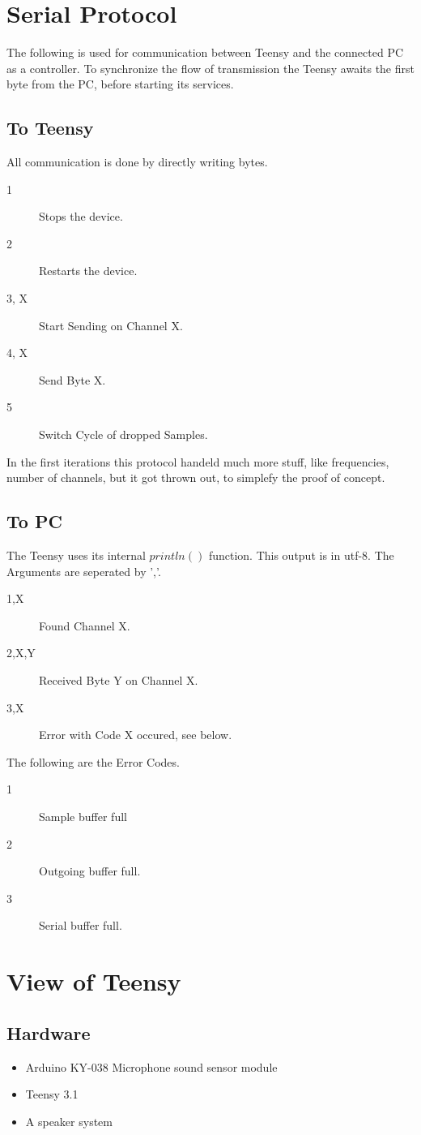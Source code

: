 \documentclass{book}
\begin{document}
\chapter{Serial Protocol}
The following is used for communication between Teensy and the connected PC as a controller. To synchronize the flow of transmission the Teensy awaits the first byte from the PC, before starting its services.
\section{To Teensy}
All communication is done by directly writing bytes. 
\begin{description}
\item[1]Stops the device.
\item[2]Restarts the device.
\item[3, X]Start Sending on Channel X.
\item[4, X]Send Byte X.
\item[5]Switch Cycle of dropped Samples.
\end{description}
In the first iterations this protocol handeld much more stuff, like frequencies, number of channels, but it got thrown out, to simplefy the proof of concept.


\section{To PC}
The Teensy uses its internal $println()$ function. This output is in utf-8. The Arguments are seperated by ','.
\begin{description}
\item[1,X]Found Channel X.
\item[2,X,Y]Received Byte Y on Channel X.
\item[3,X]Error with Code X occured, see below.
\end{description}
The following are the Error Codes.
\begin{description}
\item[1]Sample buffer full
\item[2]Outgoing buffer full.
\item[3]Serial buffer full.
\end{description}

\chapter{View of Teensy}
\section{Hardware}
\begin{itemize}
\item Arduino KY-038 Microphone sound sensor module
\item Teensy 3.1
\item A speaker system
\end{itemize}
\end{document}
